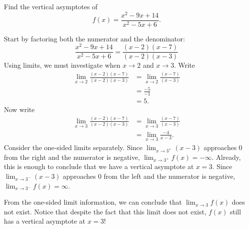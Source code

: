 \documentclass{ximera}
\begin{document}
\begin{example}
Find the vertical asymptotes of 
\[
f(x) = \frac{x^2-9x+14}{x^2-5x+6}.
\]

\begin{explanation}
Start by factoring both the numerator and the denominator:
\[
\frac{x^2-9x+14}{x^2-5x+6} = \frac{(x-2)(x-7)}{(x-2)(x-3)}
\]
Using limits, we must investigate when $x\to 2$ and $x\to 3$. Write
\begin{align*}
\displaystyle\lim_{x\to 2} \frac{(x-2)(x-7)}{(x-2)(x-3)} &= \lim_{x\to 2} \frac{(x-7)}{(x-3)}\\
&= \frac{-5}{-1}\\
&=5.
\end{align*}
Now write
\begin{align*}
\lim_{x\to 3} \frac{(x-2)(x-7)}{(x-2)(x-3)} &= \lim_{x\to 3} \frac{(x-7)}{(x-3)}\\
&= \lim_{x\to 3}\frac{-4}{x-3}.
\end{align*}
Consider the one-sided limits separately.  Since $\displaystyle\lim_{x\to 3^+}
(x-3)$ approaches $0$ from the right and the numerator is negative,
$\displaystyle\lim_{x\to 3^+} f(x) = -\infty$.  Already, this is enough to conclude that we have a vertical asymptote at $x=3$.  Since $\displaystyle\lim_{x\to 3^-} (x-3)$
approaches $0$ from the left and the numerator is negative,
$\displaystyle\lim_{x\to 3^-} f(x) = \infty$.
\begin{image}
\end{image}

From the one-sided limit information, we can conclude that $\displaystyle\lim_{x\to 3} f(x)$ does not exist.  Notice that despite the fact that this limit does not exist, $f(x)$ still has a vertical asymptote at $x=3$! 
\end{explanation}
\end{example}
\end{document}
